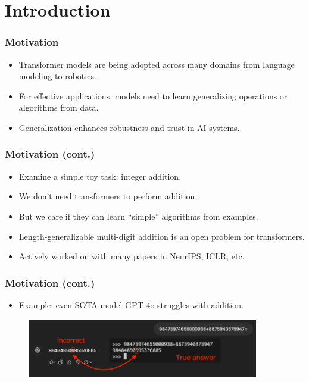 \documentclass[14pt,aspectratio=169]{beamer}
\institute{Universit\"at Hamburg\\\trinstitute}
\title{\trtitle}
\author{\trauthor}
\date{}
\theoremstyle{remark}
\begin{document}
\begin{frame}[plain]
    \titlepage
\end{frame}


\section{Introduction}

\begin{frame}
    \frametitle{Motivation}
    \begin{itemize}
        \item Transformer models are being adopted across many domains from language modeling to robotics.
        \item For effective applications, models need to learn generalizing operations or algorithms from data.
        \item Generalization enhances robustness and trust in AI systems.
    \end{itemize}
\end{frame}

\begin{frame}
    \frametitle{Motivation (cont.)}
    \begin{itemize}
        \item Examine a simple toy task: integer addition.
        \item We don't need transformers to perform addition.
        \item But we care if they can learn ``simple'' algorithms from examples.
        \item Length-generalizable multi-digit addition is an open problem for transformers.
        \item Actively worked on with many papers in NeurIPS, ICLR, etc.
    \end{itemize}
\end{frame}

\begin{frame}
    \frametitle{Motivation (cont.)}
    \begin{itemize}
        \item Example: even SOTA model GPT-4o struggles with addition.
    \end{itemize}
    \begin{figure}
        \centering
        \includegraphics[width=0.9\textwidth]{fig/gpt4o_add_fail.png}
    \end{figure}
\end{frame}
\end{document}

